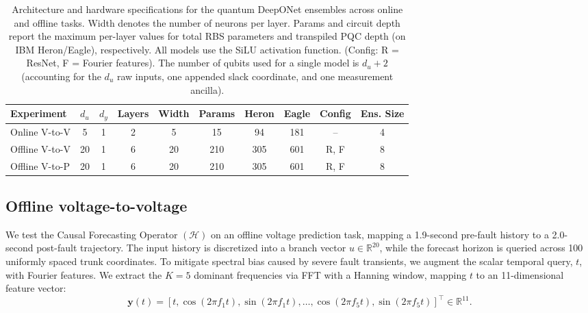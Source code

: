 \documentclass{iopjournal}
\begin{document}
\begin{table}[t]

\caption{Architecture and hardware specifications for the quantum DeepONet ensembles across online and offline tasks. Width denotes the number of neurons per layer. Params and circuit depth report the maximum per-layer values for total RBS parameters and transpiled PQC depth (on IBM Heron/Eagle), respectively. All models use the SiLU activation function. (Config: R = ResNet, F = Fourier features). The number of qubits used for a single model is $d_u + 2$ (accounting for the $d_u$ raw inputs, one appended slack coordinate, and one measurement ancilla).}
\label{tab:model_architectures_all}

\begin{center}
\begin{tabular}{lccccccccc}
\hline
\textbf{Experiment} & $d_u$ & $d_y$ & \textbf{Layers} & \textbf{Width} & \textbf{Params} & \textbf{Heron} & \textbf{Eagle} & \textbf{Config} & \textbf{Ens. Size} \\
\hline

Online V-to-V  & 5  & 1 & 2 & 5  & 15  & 94  & 181 & --   & 4 \\
Offline V-to-V & 20 & 1 & 6 & 20 & 210 & 305 & 601 & R, F & 8 \\
Offline V-to-P & 20 & 1 & 6 & 20 & 210 & 305 & 601 & R, F & 8 \\

\hline
\end{tabular}
\end{center}

\end{table}

\subsection{Offline voltage-to-voltage}

We test the Causal Forecasting Operator $(\mathcal H)$ on an offline voltage prediction task, mapping a 1.9-second pre-fault history to a 2.0-second post-fault trajectory. The input history is discretized into a branch vector $u\in \mathbb R^{20}$, while the forecast horizon is queried across 100 uniformly spaced trunk coordinates. To mitigate spectral bias caused by severe fault transients, we augment the scalar temporal query, $t$, with Fourier features. We extract the $K=5$ dominant frequencies via FFT with a Hanning window, mapping $t$ to an 11-dimensional feature vector:
\[
    \mathbf{y}(t) = [t, \cos(2\pi f_1 t), \sin(2\pi f_1 t), \dots, \cos(2\pi f_5 t), \sin(2\pi f_5 t)]^{\top} \in \mathbb{R}^{11}.
\]
\end{document}
